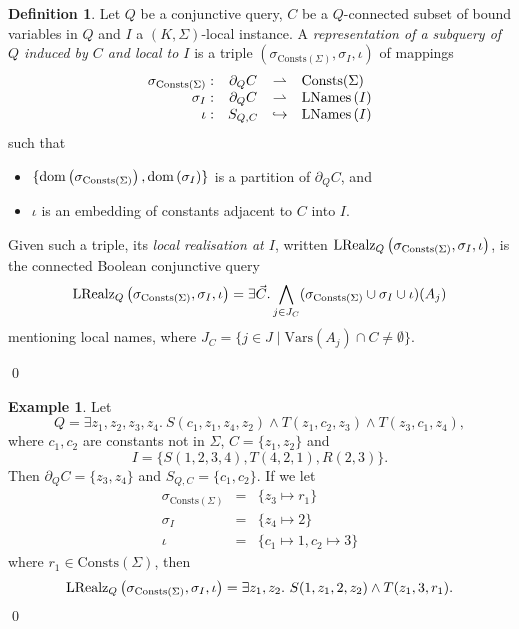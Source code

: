 \documentclass[12pt]{report}
\theoremstyle{plain}
\theoremstyle{definition}
\newtheorem{definition}[theorem]{Definition}
\newtheorem{example}[theorem]{Example}
\def\Vars{{\mathrm{Vars}}}
\def\Consts{{\mathrm{Consts}}}
\newcommand{\dom}[1]{\ensuremath{\normalfont{\operatorname{dom}} \left( #1 \right)}}
\newcommand{\LNames}[1]{\ensuremath{\normalfont{\textrm{LNames}} \left( #1 \right)}}
\newcommand{\LRealz}[2]{\ensuremath{\normalfont{\textrm{LRealz}}_{ #1 } \left( #2 \right)}}
\begin{document}
\begin{definition}
  Let $Q$ be a conjunctive query, $C$ be a $Q$-connected subset of bound variables in $Q$ and $I$ a $(K, \Sigma)$-local instance. A \emph{representation of a subquery of $Q$ induced by $C$ and local to $I$} is a triple $(\sigma_{\Consts(\Sigma)}, \sigma_I, \iota)$ of mappings
  \[\begin{array}{rccl}
    \sigma_{\Consts(\Sigma)}: & \partial_Q C &\rightharpoonup& \Consts(\Sigma) \\
    \sigma_I: & \partial_Q C &\rightharpoonup& \LNames{I} \\
    \iota: & S_{Q,C} &\hookrightarrow& \LNames{I}
  \end{array}\]
  such that \begin{itemize}
    \item $\{ \dom{\sigma_{\Consts(\Sigma)}}, \dom{\sigma_I} \}$ is a partition of $\partial_Q C$, and
    \item $\iota$ is an embedding of constants adjacent to $C$ into $I$.
  \end{itemize}

  Given such a triple, its \emph{local realisation at $I$}, written $\LRealz{Q}{\sigma_{\Consts(\Sigma)}, \sigma_I, \iota}$, is the connected Boolean conjunctive query $$
  \LRealz{Q}{\sigma_{\Consts(\Sigma)}, \sigma_I, \iota} = \exists \vec{C}. \bigwedge_{j \in J_C} (\sigma_{\Consts(\Sigma)} \cup \sigma_I \cup \iota)(A_j)
  $$
  mentioning local names, where $J_C = \{ j \in J \mid \Vars(A_j) \cap C \neq \emptyset \}$.

  \qed
\end{definition}

\begin{example}
\label{local-realisation-of-subquery-representation}
  Let
  $$
    Q = \exists z_1,z_2,z_3,z_4.\ S(c_1, z_1, z_4, z_2) \wedge T(z_1, c_2, z_3) \wedge T(z_3, c_1, z_4),
  $$
  where $c_1, c_2$ are constants not in $\Sigma$, $C = \{z_1, z_2\}$ and $$I = \{ S(1, 2, 3, 4), T(4, 2, 1), R(2, 3) \}.$$
  Then $\partial_Q C = \{ z_3, z_4 \}$ and $S_{Q,C} = \{c_1, c_2\}$. If we let
  \[\begin{array}{rcl}
    \sigma_{\Consts(\Sigma)} &=& \{ z_3 \mapsto r_1 \} \\
    \sigma_I &=& \{ z_4 \mapsto 2 \} \\
    \iota &=& \{ c_1 \mapsto 1, c_2 \mapsto 3 \}
  \end{array}\]
  where $r_1 \in \Consts(\Sigma)$, then $$
  \LRealz{Q}{\sigma_{\Consts(\Sigma)}, \sigma_I, \iota} = \exists z_1, z_2.\ S(1, z_1, 2, z_2) \wedge T(z_1, 3, r_1).
  $$
  \qed
\end{example}
\end{document}
